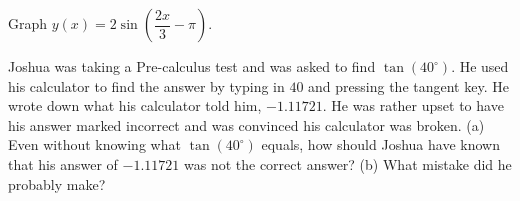 \documentclass[../book.tex]{subfiles}
\begin{document}
\begin{reviewset}
\item Graph $y(x)=2\sin\left(\dfrac{2x}{3}-\pi\right)$. \vspace{3mm}
\item Joshua was taking a Pre-calculus test and was asked to find $\tan(40^{\circ})$. He used his calculator to find the answer by typing in $40$ and pressing the tangent key. He wrote down what his calculator told him, $-1.11721$. He was rather upset to have his answer marked incorrect and was convinced his calculator was broken. \newline 
(a) Even without knowing what $\tan(40^{\circ})$ equals, how should Joshua have known that his answer of $-1.11721$ was not the correct answer? \newline 
(b) What mistake did he probably make? \vspace{3mm}
\end{reviewset}
\end{document}
